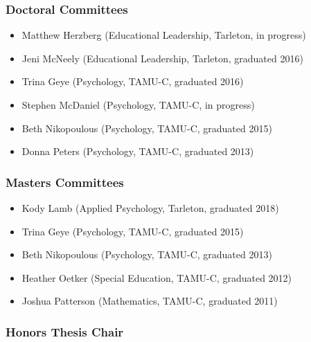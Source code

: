 \documentclass[article,10pt]{article}
\begin{document}
\subsubsection*{Doctoral Committees}
\label{sec:org1e27755}

\begin{itemize}
\item Matthew Herzberg (Educational Leadership, Tarleton, in progress)
\item Jeni McNeely (Educational Leadership, Tarleton, graduated 2016)
\item Trina Geye (Psychology, TAMU-C, graduated 2016)
\item Stephen McDaniel (Psychology, TAMU-C, in progress)
\item Beth Nikopoulous (Psychology, TAMU-C, graduated 2015)
\item Donna Peters (Psychology, TAMU-C, graduated 2013)
\end{itemize}

\subsubsection*{Masters Committees}
\label{sec:org0e3466f}

\begin{itemize}
\item Kody Lamb (Applied Psychology, Tarleton, graduated 2018)
\item Trina Geye (Psychology, TAMU-C, graduated 2015)
\item Beth Nikopoulous (Psychology, TAMU-C, graduated 2013)
\item Heather Oetker (Special Education, TAMU-C, graduated 2012)
\item Joshua Patterson (Mathematics, TAMU-C, graduated 2011)
\end{itemize}

\subsubsection*{Honors Thesis Chair}
\label{sec:org71908c6}
\end{document}
